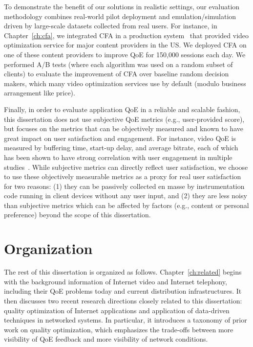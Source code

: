 \begin{itemize}
\end{itemize}


To demonstrate the benefit of our solutions in realistic settings, 
our evaluation methodology combines real-world pilot deployment and 
emulation/simulation driven by large-scale datasets collected from real  users.
For instance, in Chapter~\ref{ch:cfa}, we integrated CFA in a production 
system~\cite{c3} that provided video optimization service for major content
providers in the US.
We deployed CFA on one of these content providers to improve QoE for
150,000 sessions each day. We performed A/B tests (where each algorithm
was used on a random subset of clients) to evaluate
the improvement of CFA over baseline random decision
makers, which many video optimization services use 
by default (modulo business arrangement like price).

%
Finally, in order to evaluate application QoE in a reliable 
and scalable fashion, this dissertation does not use subjective QoE 
metrics (e.g., user-provided score), but focuses on the metrics that can be
objectively measured and known to have great impact on user satisfaction 
and engagement.
For instance, video QoE is measured by buffering time, start-up delay,
and average bitrate, each of which has been shown to have strong
correlation with user engagement in multiple 
studies~\cite{sigcomm11,akamai-imc12}.
While subjective metrics can directly reflect user satisfaction, we
choose to use these objectively measurable 
metrics as a proxy for real user satisfaction for two reasons:
(1) they can be passively collected en masse by instrumentation code 
running in client devices without any user input, and (2) they
are less noisy than subjective metrics which can be affected by factors
(e.g., content or personal preference) beyond the scope of this dissertation.




\section{Organization}
The rest of this dissertation is organized as follows.
Chapter~\ref{ch:related} begins with the background information of
Internet video and Internet telephony, including their QoE problems
today and current distribution infrastructures.
It then discusses two recent research directions closely 
related to this dissertation: 
quality optimization of Internet applications and application of data-driven 
techniques in networked systems.
In particular, it introduces a taxonomy of prior work on quality 
optimization, which emphasizes the trade-offs between 
more visibility of QoE feedback and more visibility of network
conditions.

